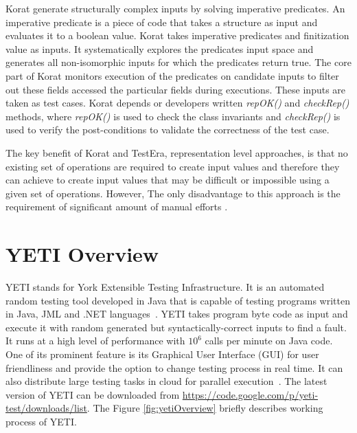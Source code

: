 Korat generate structurally complex inputs by solving imperative predicates. An imperative predicate is a piece of code that takes a structure as input and evaluates it to a boolean value. Korat takes imperative predicates and finitization value as inputs. It systematically explores the predicates input space and generates all non-isomorphic inputs for which the predicates return true. The core part of Korat monitors execution of the predicates on candidate inputs to filter out these fields accessed the particular fields during executions. These inputs are taken as test cases. Korat depends or developers written {\it repOK()} and {\it checkRep()} methods, where {\it repOK()} is used to check the class invariants and {\it checkRep()} is used to verify the post-conditions to validate the correctness of the test case. 

The key benefit of Korat and TestEra, representation level approaches, is that no existing set of operations are required to create input values and therefore they can achieve to create input values that may be difficult or impossible using a given set of operations. However, The only disadvantage to this approach is the requirement of significant amount of manual efforts \cite{pacheco2009directed}.    


\newpage

\section{YETI Overview}
YETI stands for York Extensible Testing Infrastructure. It is an automated random testing tool developed in Java that is capable of testing programs written in Java, JML and .NET languages~\cite{Oriol2010c}. YETI takes program byte code as input and execute it with random generated but syntactically-correct inputs to find a fault. It runs at a high level of performance with $10^6$ calls per minute on Java code. One of its prominent feature is its Graphical User Interface (GUI) for user friendliness and provide the option to change testing process in real time. It can also distribute large testing tasks in cloud for parallel execution~\cite{Oriol2010}. The latest version of YETI can be downloaded from \url{https://code.google.com/p/yeti-test/downloads/list}. The Figure \ref{fig:yetiOverview} briefly describes working process of YETI. 

